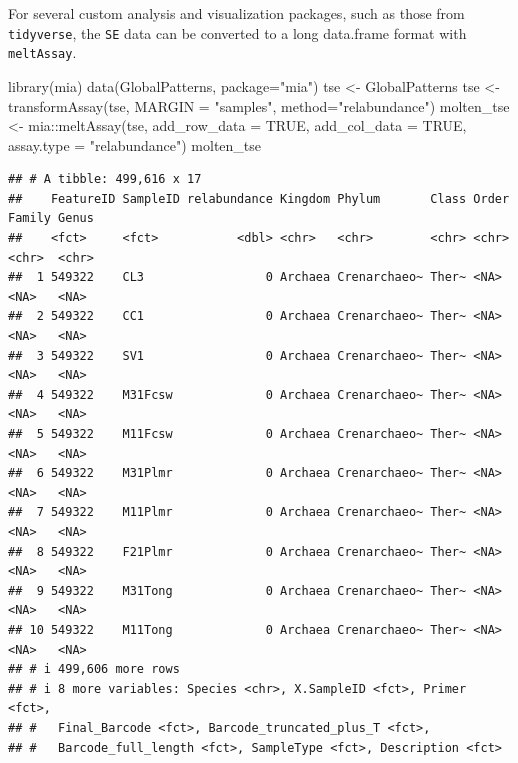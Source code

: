 \documentclass[
]{book}
\newenvironment{Shaded}{\begin{snugshade}}{\end{snugshade}}
\newcommand{\AttributeTok}[1]{\textcolor[rgb]{0.77,0.63,0.00}{#1}}
\newcommand{\ConstantTok}[1]{\textcolor[rgb]{0.00,0.00,0.00}{#1}}
\newcommand{\FunctionTok}[1]{\textcolor[rgb]{0.00,0.00,0.00}{#1}}
\newcommand{\NormalTok}[1]{#1}
\newcommand{\OtherTok}[1]{\textcolor[rgb]{0.56,0.35,0.01}{#1}}
\newcommand{\SpecialCharTok}[1]{\textcolor[rgb]{0.00,0.00,0.00}{#1}}
\newcommand{\StringTok}[1]{\textcolor[rgb]{0.31,0.60,0.02}{#1}}
\begin{document}
For several custom analysis and visualization packages, such as those from
\texttt{tidyverse}, the \texttt{SE} data can be converted to a long data.frame format with
\texttt{meltAssay}.

\begin{Shaded}
\begin{Highlighting}[]
\FunctionTok{library}\NormalTok{(mia)}
\FunctionTok{data}\NormalTok{(GlobalPatterns, }\AttributeTok{package=}\StringTok{"mia"}\NormalTok{)}
\NormalTok{tse }\OtherTok{\textless{}{-}}\NormalTok{ GlobalPatterns}
\NormalTok{tse }\OtherTok{\textless{}{-}} \FunctionTok{transformAssay}\NormalTok{(tse, }\AttributeTok{MARGIN =} \StringTok{"samples"}\NormalTok{, }\AttributeTok{method=}\StringTok{"relabundance"}\NormalTok{)}
\NormalTok{molten\_tse }\OtherTok{\textless{}{-}}\NormalTok{ mia}\SpecialCharTok{::}\FunctionTok{meltAssay}\NormalTok{(tse,}
                        \AttributeTok{add\_row\_data =} \ConstantTok{TRUE}\NormalTok{,}
                        \AttributeTok{add\_col\_data =} \ConstantTok{TRUE}\NormalTok{,}
                        \AttributeTok{assay.type =} \StringTok{"relabundance"}\NormalTok{)}
\NormalTok{molten\_tse}
\end{Highlighting}
\end{Shaded}

\begin{verbatim}
## # A tibble: 499,616 x 17
##    FeatureID SampleID relabundance Kingdom Phylum       Class Order Family Genus
##    <fct>     <fct>           <dbl> <chr>   <chr>        <chr> <chr> <chr>  <chr>
##  1 549322    CL3                 0 Archaea Crenarchaeo~ Ther~ <NA>  <NA>   <NA> 
##  2 549322    CC1                 0 Archaea Crenarchaeo~ Ther~ <NA>  <NA>   <NA> 
##  3 549322    SV1                 0 Archaea Crenarchaeo~ Ther~ <NA>  <NA>   <NA> 
##  4 549322    M31Fcsw             0 Archaea Crenarchaeo~ Ther~ <NA>  <NA>   <NA> 
##  5 549322    M11Fcsw             0 Archaea Crenarchaeo~ Ther~ <NA>  <NA>   <NA> 
##  6 549322    M31Plmr             0 Archaea Crenarchaeo~ Ther~ <NA>  <NA>   <NA> 
##  7 549322    M11Plmr             0 Archaea Crenarchaeo~ Ther~ <NA>  <NA>   <NA> 
##  8 549322    F21Plmr             0 Archaea Crenarchaeo~ Ther~ <NA>  <NA>   <NA> 
##  9 549322    M31Tong             0 Archaea Crenarchaeo~ Ther~ <NA>  <NA>   <NA> 
## 10 549322    M11Tong             0 Archaea Crenarchaeo~ Ther~ <NA>  <NA>   <NA> 
## # i 499,606 more rows
## # i 8 more variables: Species <chr>, X.SampleID <fct>, Primer <fct>,
## #   Final_Barcode <fct>, Barcode_truncated_plus_T <fct>,
## #   Barcode_full_length <fct>, SampleType <fct>, Description <fct>
\end{verbatim}
\end{document}
